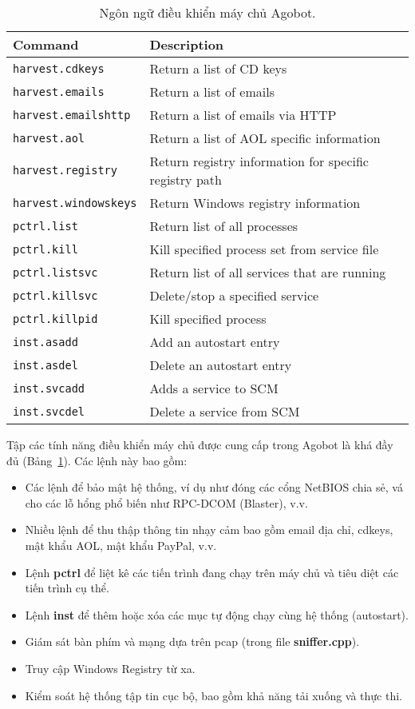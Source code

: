 \begin{table}[ht]
	\caption{Ngôn ngữ điều khiển máy chủ Agobot.}\label{table:botctrl}
	\centering
	\footnotesize
	\begin{tabular}{l l}
		\toprule
		\textbf{Command} &
		\textbf{Description} \\
		\midrule
		\texttt{harvest.cdkeys} & Return a list of CD keys \\
		\texttt{harvest.emails} & Return a list of emails \\
		\texttt{harvest.emailshttp} & Return a list of emails via HTTP \\
		\texttt{harvest.aol} & Return a list of AOL specific information \\
		\texttt{harvest.registry} & Return registry information for specific registry path \\
		\texttt{harvest.windowskeys} & Return Windows registry information \\
		\texttt{pctrl.list} & Return list of all processes \\
		\texttt{pctrl.kill} & Kill specified process set from service file \\
		\texttt{pctrl.listsvc} & Return list of all services that are running \\
		\texttt{pctrl.killsvc} & Delete/stop a specified service \\
		\texttt{pctrl.killpid} & Kill specified process \\
		\texttt{inst.asadd} & Add an autostart entry \\
		\texttt{inst.asdel} & Delete an autostart entry \\
		\texttt{inst.svcadd} & Adds a service to SCM \\
		\texttt{inst.svcdel} & Delete a service from SCM \\
		\bottomrule
	\end{tabular}
\end{table}

Tập các tính năng điều khiển máy chủ được cung cấp trong Agobot là khá đầy đủ (Bảng~\ref{table:botctrl}).
Các lệnh này bao gồm:

\begin{itemize}
\item Các lệnh để bảo mật hệ thống, ví dụ như đóng các cổng NetBIOS chia sẻ,
	vá cho các lỗ hổng phổ biến như RPC-DCOM (Blaster), v.v.
\item Nhiều lệnh để thu thập thông tin nhạy cảm bao gồm email
	địa chỉ, cdkeys, mật khẩu AOL, mật khẩu PayPal, v.v.
\item Lệnh \textbf{pctrl} để liệt kê các tiến trình đang chạy trên máy chủ và
	tiêu diệt các tiến trình cụ thể.
\item Lệnh \textbf{inst} để thêm hoặc xóa các mục tự động chạy cùng hệ thống (autostart).
\item Giám sát bàn phím và mạng dựa trên pcap (trong file \textbf{sniffer.cpp}).
\item Truy cập Windows Registry từ xa.
\item Kiểm soát hệ thống tập tin cục bộ, bao gồm khả năng tải xuống và thực thi.
\end{itemize}

